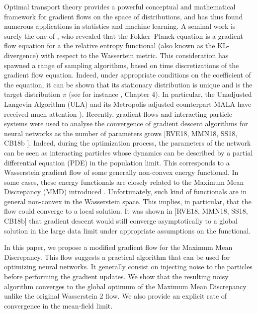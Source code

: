 Optimal transport   theory provides a powerful conceptual and mathematical framework for gradient flows on the space of distributions, and has thus found numerous applications in statistics and machine learning. A seminal work is surely the one of \cite{jordan1998variational}, who revealed that the Fokker–Planck equation is a gradient
flow equation for a the relative entropy functional (also known as the KL-divergence) with respect to the Wassertein metric. This consideration has spawned a range of sampling
algorithms, based on time discretizations of the gradient flow equation. Indeed, under appropriate conditions on the coefficient of the equation, it can be shown that its stationary distribution is unique and is the target distribution $\pi$ (see for instance \cite{pavliotis2011stochastic}, Chapter 4). In particular, the Unadjusted
Langevin Algorithm (ULA) and its Metropolis adjusted counterpart MALA have received much
attention \cite{durmus2018analysis,bernton2018langevin}). Recently, gradient flows and interacting particle systems were used to analyse the convergence of gradient descent algorithms for neural networks as the number of parameters grows \cite{chizat2018global,rotskoff2019global} [RVE18, MMN18, SS18, CB18b ]. Indeed, during the optimization process, the parameters of the network can be seen as interacting particles whose dynamics can be described by a partial differential equation (PDE) in the population limit. This corresponds to a Wasserstein gradient flow of some generally non-convex energy functional. In some cases, these energy functionals are closely related to the Maximum Mean Discrepancy (MMD) introduced \cite{gretton2012kernel}. Unfortunately, such kind of functionals are in general non-convex in the Wasserstein space. This implies, in particular, that the flow could converge to a local solution.  It was shown in \cite{chizat2018global,rotskoff2019global} [RVE18, MMN18, SS18, CB18b] that gradient descent would still converge asymptotically to a global solution in the large data limit under appropriate assumptions on the functional. 

In this paper, we propose a modified gradient flow for the Maximum Mean Discrepancy. This flow suggests a practical algorithm that can be used for optimizing neural networks. It generally consist on injecting noise to the particles before performing the gradient updates. We show that the resulting noisy algorithm converges to the global optimum of the Maximum Mean Discrepancy unlike the original Wasserstein 2 flow. We also provide an explicit rate of convergence in the mean-field limit.  


